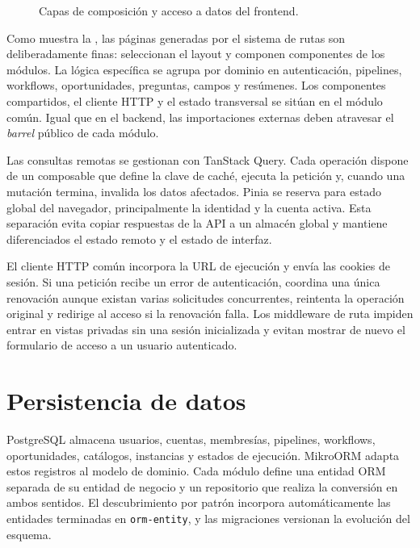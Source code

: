 \begin{figure}[htbp]
  \centering
  \resizebox{0.96\textwidth}{!}{
    
  }
  \caption{Capas de composición y acceso a datos del frontend.}
  \label{fig:frontend-architecture}
\end{figure}

Como muestra la , las páginas generadas por el
sistema de rutas son deliberadamente finas:
seleccionan el layout y componen componentes de los módulos. La lógica
específica se agrupa por dominio en autenticación, pipelines, workflows,
oportunidades, preguntas, campos y resúmenes. Los componentes compartidos, el
cliente HTTP y el estado transversal se sitúan en el módulo común. Igual que
en el backend, las importaciones externas deben atravesar el \emph{barrel}
público de cada módulo.

Las consultas remotas se gestionan con TanStack Query. Cada operación dispone
de un composable que define la clave de caché, ejecuta la petición y, cuando una
mutación termina, invalida los datos afectados. Pinia se reserva para estado
global del navegador, principalmente la identidad y la cuenta activa. Esta
separación evita copiar respuestas de la API a un almacén global y mantiene
diferenciados el estado remoto y el estado de interfaz.

El cliente HTTP común incorpora la URL de ejecución y envía las cookies de
sesión. Si una petición recibe un error de autenticación, coordina una única
renovación aunque existan varias solicitudes concurrentes, reintenta la
operación original y redirige al acceso si la renovación falla. Los middleware
de ruta impiden entrar en vistas privadas sin una sesión inicializada y evitan
mostrar de nuevo el formulario de acceso a un usuario autenticado.

\section{Persistencia de datos}
\label{sec:persistence-architecture}

PostgreSQL almacena usuarios, cuentas, membresías, pipelines, workflows,
oportunidades, catálogos, instancias y estados de ejecución. MikroORM adapta
estos registros al modelo de dominio. Cada módulo define una entidad ORM
separada de su entidad de negocio y un repositorio que realiza la conversión en
ambos sentidos. El descubrimiento por patrón incorpora automáticamente las
entidades terminadas en \texttt{orm-entity}, y las migraciones versionan la
evolución del esquema.

